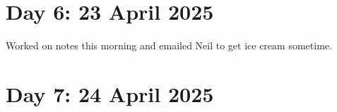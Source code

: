 \documentclass{article}
\begin{document}
\section*{Day 6: 23 April 2025}
Worked on notes this morning and emailed Neil to get ice cream sometime.

\section*{Day 7: 24 April 2025}
\end{document}
